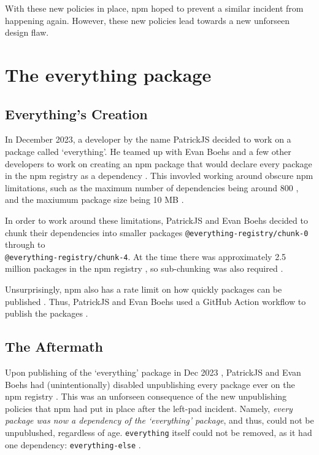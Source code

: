 \documentclass[acmsmall]{acmart}
\begin{document}
With these new policies in place, npm hoped to prevent a similar incident from
happening again. However, these new policies lead towards a new unforseen design
flaw.

\section{The everything package}
\subsection{Everything's Creation}
In December 2023, a developer by the name PatrickJS decided to work on a package
called `everything'. He teamed up with Evan Boehs and a few other developers to
work on creating an npm package that would declare every package in the npm
registry as a dependency \cite{uncenter-blog-everything}. This invovled working
around obscure npm limitations, such as the maximum number of dependencies being
around 800 \cite{uncenter-blog-everything, youtube-everything}, and the maxiumum
package size being 10 MB \cite{uncenter-blog-everything, youtube-everything}.

In order to work around these limitations, PatrickJS and Evan Boehs decided to
chunk their dependencies into smaller packages
\lstinline|@everything-registry/chunk-0| through to \\
\lstinline|@everything-registry/chunk-4|. At the time there was approximately
2.5 million packages in the npm registry \cite{youtube-everything}, so
sub-chunking was also required \cite{youtube-everything}.

Unsurprisingly, npm also has a rate limit on how quickly packages can be
published \cite{npm-ratelimiting}. Thus, PatrickJS and Evan Boehs used a GitHub
Action workflow to publish the packages
\cite{youtube-everything,uncenter-blog-everything}.

\subsection{The Aftermath}
Upon publishing of the `everything' package in Dec 2023 \cite{npm-everything},
PatrickJS and Evan Boehs had (unintentionally) disabled unpublishing every
package ever on the npm registry \cite{youtube-everything}. This was an
unforseen consequence of the new unpublishing policies that npm had put in place
after the left-pad incident. Namely, \textit{every package was now a dependency
  of the `everything' package}, and thus, could not be unpublushed, regardless of
age. \lstinline|everything| itself could not be removed, as it had one
dependency: \lstinline|everything-else| \cite{npm-everything-else}.
\end{document}
